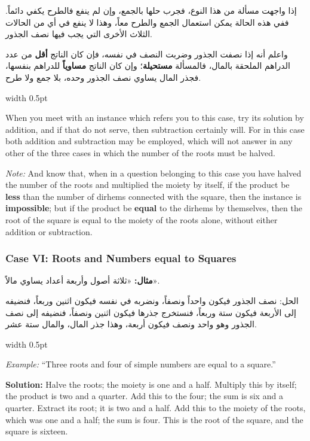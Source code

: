 \documentclass[10pt,a4paper]{book}
\newlength{\colwidth}
\newcommand{\bilingualpair}[2]{%
  \noindent
  \begin{minipage}[t]{\colwidth}
  \begin{flushright}
  \vspace{0pt}
  {\arabicfont\small #1}
  \end{flushright}
  \end{minipage}%
  \hfill\textcolor{columnsepclr}{\vrule width 0.5pt}\hfill
  \begin{minipage}[t]{\colwidth}
  \vspace{0pt}
  {\small #2}
  \end{minipage}%
  \par\vspace{0.6em}
}
\newcommand{\cnote}[1]{\textcolor{notecolor}{\textit{#1}}}
\begin{document}
\bilingualpair{
إذا واجهت مسألة من هذا النوع، فجرب حلها بالجمع، وإن لم
ينفع فالطرح يكفي دائماً. ففي هذه الحالة يمكن استعمال الجمع
والطرح معاً، وهذا لا ينفع في أي من الحالات الثلاث الأخرى التي
يجب فيها نصف الجذور.

واعلم أنه إذا نصفت الجذور وضربت النصف في نفسه، فإن كان
الناتج \textbf{أقل} من عدد الدراهم الملحقة بالمال، فالمسألة
\textbf{مستحيلة}؛ وإن كان الناتج \textbf{مساوياً} للدراهم
بنفسها، فجذر المال يساوي نصف الجذور وحده، بلا جمع ولا طرح.
}{
When you meet with an instance which refers you to this case, try its
solution by addition, and if that do not serve, then subtraction certainly
will. For in this case both addition and subtraction may be employed, which
will not answer in any other of the three cases in which the number of the
roots must be halved.

\cnote{Note:} And know that, when in a question belonging to this case you
have halved the number of the roots and multiplied the moiety by itself, if
the product be \textbf{less} than the number of dirhems connected with the
square, then the instance is \textbf{impossible}; but if the product be
\textbf{equal} to the dirhems by themselves, then the root of the square is
equal to the moiety of the roots alone, without either addition or
subtraction.
}

\subsubsection*{Case VI: Roots and Numbers equal to Squares}

\bilingualpair{
\textbf{مثال:} «ثلاثة أصول وأربعة أعداد يساوي مالاً».

الحل: نصف الجذور فيكون واحداً ونصفاً، ونضربه في نفسه فيكون
اثنين وربعاً، فنضيفه إلى الأربعة فيكون ستة وربعاً، فنستخرج
جذرها فيكون اثنين ونصفاً، فنضيفه إلى نصف الجذور وهو واحد
ونصف فيكون أربعة، وهذا جذر المال، والمال ستة عشر.
}{
\textit{Example:} ``Three roots and four of simple numbers are equal to a
square.''

\textbf{Solution:} Halve the roots; the moiety is one and a half. Multiply
this by itself; the product is two and a quarter. Add this to the four; the
sum is six and a quarter. Extract its root; it is two and a half. Add this
to the moiety of the roots, which was one and a half; the sum is four. This
is the root of the square, and the square is sixteen.
}
\end{document}
